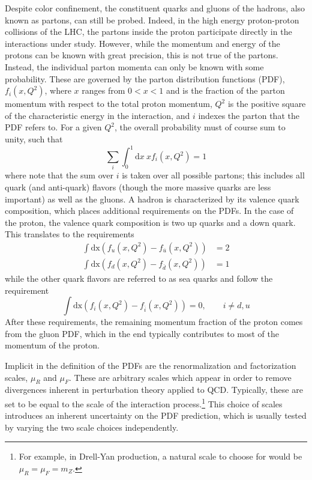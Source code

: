 Despite color confinement, 
the constituent quarks and gluons of the hadrons, also known as partons, can still 
be probed. Indeed, in the high energy proton-proton collisions of the LHC, 
the partons inside the proton participate
directly in the interactions under study.  However,
while the momentum and energy of the protons can be known with
great precision, 
this is not true of the partons. Instead, the individual
parton momenta can only be known with some probability.
These are governed by the parton distribution functions (PDF),
$f_i(x,Q^2)$, where $x$ ranges from $0<x<1$ and is the fraction of 
the parton momentum 
with respect to the total proton momentum, $Q^2$ is the positive square
of the characteristic energy in the interaction, and $i$ indexes the parton
that the PDF refers to.
For a given $Q^2$, the overall probability must of course sum to unity, such that
\begin{equation}
\sum_i \int_0^1 \mathrm{d}x~x f_i(x,Q^2) = 1
\end{equation}
where note that the sum over $i$ is taken over all possible partons;
this includes all quark (and anti-quark) flavors (though the more massive quarks 
are less important) as well as the gluons.
A hadron is characterized by its valence quark 
composition, which places additional requirements on the PDFs. 
In the case of the proton, the valence quark composition is 
two up quarks and a down quark.
This translates to the requirements 
\begin{align}
\int \mathrm{dx} (f_u(x,Q^2) - f_{\overline{u}}(x,Q^2) ) &= 2 \\
\int \mathrm{dx} (f_d(x,Q^2) - f_{\overline{d}}(x,Q^2) ) &= 1 
\end{align}
while the other quark flavors are referred to as sea quarks 
and follow the requirement
\begin{equation}
\int \mathrm{dx} (f_i(x,Q^2) - f_{\overline{i}}(x,Q^2) ) = 0, ~~~~~~~~~ i\neq d,u
\end{equation}
After these requirements, the remaining momentum fraction of the proton
comes from the gluon PDF, which in the end typically contributes to most
of the momentum of the proton.

Implicit in the definition of the PDFs are the renormalization and 
factorization scales, $\mu_R$ and $\mu_F$. These are arbitrary 
scales which appear in order to remove divergences
inherent in perturbation theory applied to QCD. Typically, these
are set to be equal to the scale of the interaction process.\footnote{For 
example, in Drell-Yan production, a natural scale to choose
for would be $\mu_R = \mu_F = m_Z$.} This choice of scales
introduces an inherent uncertainty on the PDF prediction, 
which is usually tested by varying the two scale choices independently. 


